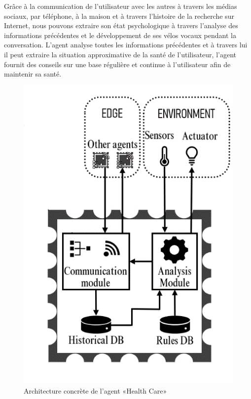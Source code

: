 Grâce à la communication de l'utilisateur avec les autres à travers les médias sociaux, par téléphone, à la maison et à travers l'histoire de la recherche sur Internet, nous pouvons extraire son état psychologique à travers l'analyse des informations précédentes et le développement de ses vélos vocaux pendant la conversation.
L'agent analyse toutes les informations précédentes et à travers lui il peut extraire la situation approximative de la santé de l'utilisateur, l'agent fournit des conseils sur une base régulière et continue à l'utilisateur afin de maintenir sa santé.
\begin{figure}[H]
\centering
\includegraphics[scale=1.5]{chap1/agent.png}
\caption{Architecture concrète de l'agent «Health Care»}
\label{fc12}
\end{figure}

